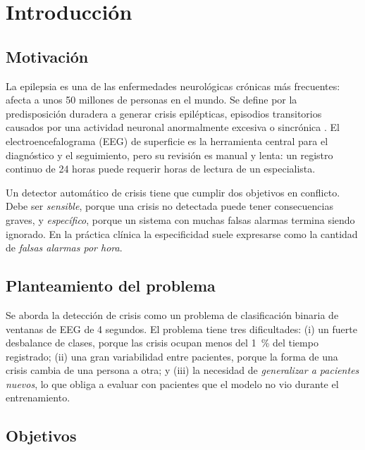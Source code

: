 \chapter{Introducción}
\label{cap:introduccion}

\section{Motivación}

La epilepsia es una de las enfermedades neurológicas crónicas más frecuentes: afecta a unos 50 millones de personas en el mundo. Se define por la predisposición duradera a generar crisis epilépticas, episodios transitorios causados por una actividad neuronal anormalmente excesiva o sincrónica \parencite{fisher2014}. El electroencefalograma (EEG) de superficie es la herramienta central para el diagnóstico y el seguimiento, pero su revisión es manual y lenta: un registro continuo de 24 horas puede requerir horas de lectura de un especialista.

Un detector automático de crisis tiene que cumplir dos objetivos en conflicto. Debe ser \emph{sensible}, porque una crisis no detectada puede tener consecuencias graves, y \emph{específico}, porque un sistema con muchas falsas alarmas termina siendo ignorado. En la práctica clínica la especificidad suele expresarse como la cantidad de \emph{falsas alarmas por hora}.


\section{Planteamiento del problema}

Se aborda la detección de crisis como un problema de clasificación binaria de ventanas de EEG de 4 segundos. El problema tiene tres dificultades: (i) un fuerte desbalance de clases, porque las crisis ocupan menos del 1~\% del tiempo registrado; (ii) una gran variabilidad entre pacientes, porque la forma de una crisis cambia de una persona a otra; y (iii) la necesidad de \emph{generalizar a pacientes nuevos}, lo que obliga a evaluar con pacientes que el modelo no vio durante el entrenamiento.

\section{Objetivos}

